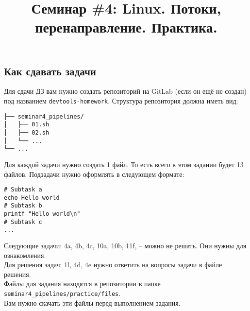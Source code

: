 \documentclass{article}
\begin{document}
\title{Семинар \#4: Linux. Потоки, перенаправление. Практика. \vspace{-5ex}}\date{}\maketitle

\subsection*{Как сдавать задачи}
Для сдачи ДЗ вам нужно создать репозиторий на GitLab (если он ещё не создан) под названием \texttt{devtools-homework}. Структура репозитория должна иметь вид:
\begin{center}
\begin{BVerbatim}
├── seminar4_pipelines/
│   ├── 01.sh
│   ├── 02.sh
│   └── ...
└── ...
\end{BVerbatim}
\end{center}
Для каждой задачи нужно создать 1 файл. То есть всего в этом задании будет 13 файлов. Подзадачи нужно оформлять в следующем формате:
\begin{lstlisting}
# Subtask a
echo Hello world
# Subtask b
printf "Hello world\n"
# Subtask c
...
\end{lstlisting}
Следующие задачи: 4a, 4b, 4c, 10a, 10b, 11f,  -- можно не решать. Они нужны для ознакомления.\\
Для решения задач: 1l, 4d, 4e нужно ответить на вопросы задачи в файле решения.\\
Файлы для задания находятся в репозитории в папке \texttt{seminar4\_pipelines/practice/files}.\\
Вам нужно скачать эти файлы перед выполнением задания.
\end{document}

